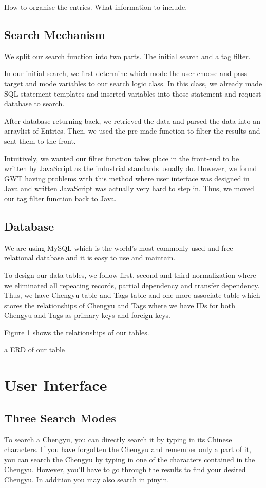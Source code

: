 \documentclass[11pt]{article} %
\begin{document}
\indent How to organise the entries. What information to include. \\

\subsection{Search Mechanism}

\indent We split our search function into two parts. The initial search and a tag filter.

In our initial search, we first determine which mode the user choose and pass target and mode variables to our search logic class. In this class, we already made SQL statement templates and inserted variables into those statement and request database to search.

After database returning back, we retrieved the data and parsed the data into an arraylist of Entries. Then, we used the pre-made function to filter the results and sent them to the front.

Intuitively, we wanted our filter function takes place in the front-end to be written by JavaScript as the industrial standards usually do. However, we found GWT having problems with this method where user interface was designed in Java and written JavaScript was actually very hard to step in. Thus, we moved our tag filter function back to Java. 

\subsection{Database}
\indent We are using MySQL which is the world's most commonly used and free relational database and it is easy to use and maintain.

To design our data tables, we follow first, second and third normalization where we eliminated all repeating records, partial dependency and transfer dependency. Thus, we have Chengyu table and Tags table and one more associate table which stores the relationships of Chengyu and Tags where we have IDs for both Chengyu and Tags as primary keys and foreign keys.

Figure 1 shows the relationships of our tables.

\indent a ERD of our table

\section{User Interface}

\subsection{Three Search Modes}
\indent To search a Chengyu, you can directly search it by typing in its Chinese characters. If you have forgotten the Chengyu and remember only a part of it, you can search the Chengyu by typing in one of the characters contained in the Chengyu. However, you'll have to go through the results to find your desired Chengyu. In addition you may also search in pinyin.
\end{document}
